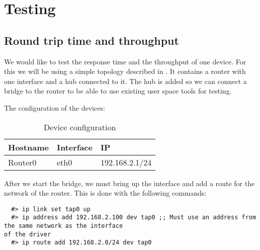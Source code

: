\chapter{Testing}
\label{chapter:testing}

\section{Round trip time and throughput}
\label{sec:response-time}


We would like to test the response time and the throughput of one device. For this we will be using
a simple topology described in . It contains a router with one interface and
a hub connected to it. The hub is added so we can connect a bridge to the router to be able to use
existing user space tools for testing.


The configuration of the devices:

\begin{center}
  \begin{table}[htb]
  \begin{center}
  \begin{tabular}{| l | l | l |}
    \hline
      Hostname & Interface & IP  \\ \hline
      Router0 & eth0 & 192.168.2.1/24 \\ 
    \hline
  \end{tabular}
  \end{center}
  \caption{Device configuration}
  \label{table:rtt-conf}
  \end{table}
\end{center}

After we start the bridge, we must bring up the interface and add a route for the network of the
router. This is done with the following commands:

\lstset{language=zsh,caption=Configuring a TAP interface,label=lst:conf-tap}
\begin{lstlisting}
  #> ip link set tap0 up
  #> ip address add 192.168.2.100 dev tap0 ;; Must use an address from the same network as the interface
of the driver
  #> ip route add 192.168.2.0/24 dev tap0
\end{lstlisting}

